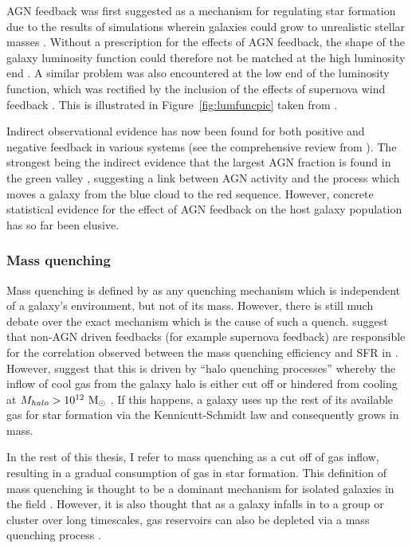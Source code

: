 AGN feedback was first suggested as a mechanism for regulating star formation due to the results of simulations wherein galaxies could grow to unrealistic stellar masses \citep{silk98, Bower06, Croton06, somerville08}. Without a prescription for the effects of AGN feedback, the shape of the galaxy luminosity function could therefore not be matched at the high luminosity end \citep{baugh98, baugh05, kauffmann99a, kauffmann99b, somerville01, kitzbichler06}. A similar problem was also encountered at the low end of the luminosity function, which was rectified by the inclusion of the effects of supernova wind feedback \citep{dekel86, powell11}. This is illustrated in Figure~\ref{fig:lumfuncpic} taken from \cite{silk12}. 

Indirect observational evidence has now been found for both positive and negative feedback in various systems (see the comprehensive review from \citealt{fabian12}). The strongest being the indirect evidence that the largest AGN fraction is found in the green valley \citep{cowie08, Hickox09, schawinski10a}, suggesting a link between AGN activity and the process which moves a galaxy from the blue cloud to the red sequence. However, concrete statistical evidence for the effect of AGN feedback on the host galaxy population has so far been elusive.


\subsubsection{Mass quenching}\label{sec:massquench}

Mass quenching is defined by \citet{peng10, peng12} as any quenching mechanism which is independent of a galaxy's environment, but not of its mass. However, there is still much debate over the exact mechanism which is the cause of such a quench. \citet{darvish16} suggest that non-AGN driven feedbacks (for example supernova feedback) are responsible for the correlation observed between the mass quenching efficiency and SFR in \citet{peng10}. However, \citet{gabor15} suggest that this is driven by ``halo quenching processes'' whereby the inflow of cool gas from the galaxy halo is either cut off or hindered from cooling at $M_{halo} > 10^{12}~\rm{M}_{\odot}$ \citep{birnboim03, dekel06}. If this happens, a galaxy uses up the rest of its available gas for star formation via the Kennicutt-Schmidt law \citep{schmidt59, kennicutt98} and consequently grows in mass.

In the rest of this thesis, I refer to mass quenching as a cut off of gas inflow, resulting in a gradual consumption of gas in star formation. This definition of mass quenching is thought to be a dominant mechanism for isolated galaxies in the field \citep{kormendy04}. However, it is also thought that as a galaxy infalls in to a group or cluster over long timescales, gas reservoirs can also be depleted via a mass quenching process \citep{peng12}. 

